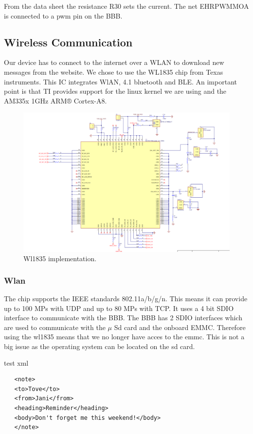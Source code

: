 From the data sheet the resistance R30 sets the current. The net EHRPWMMOA is connected to a pwm pin on the BBB.
\subsection{Wireless Communication}
Our device has to connect to the internet over a WLAN to download new messages from the website. We chose to use the WL1835 chip from Texas instruments. This IC integrates WlAN, 4.1 bluetooth and BLE. An important point is that TI provides support for the linux kernel we are using and the AM335x 1GHz ARM® Cortex-A8.

\begin{figure}[!htb]
    \centering
    \includegraphics[width=1\textwidth,keepaspectratio]{chap/hardFig/wl1835_chip_sch}
    \caption{Wl1835 implementation.}
    \label{fig:wl1835 chip}
\end{figure}

\subsubsection{Wlan}
The chip supports the IEEE standards 802.11a/b/g/n. This means it can provide up to 100 MPs with UDP and up to 80 MPs with TCP.
It uses a 4 bit SDIO interface to communicate with the BBB. The BBB has 2 SDIO interfaces which are used to communicate with the $\mu$
 Sd card and the onboard EMMC. Therefore using the wl1835 means that we no longer have acces to the emmc. This is not a big issue as the operating system can be located on the sd card.

 test xml

 \lstset{escapechar=@,style=customxml}
 \begin{lstlisting}
   <note>
   <to>Tove</to>
   <from>Jani</from>
   <heading>Reminder</heading>
   <body>Don't forget me this weekend!</body>
   </note>

 \end{lstlisting}

